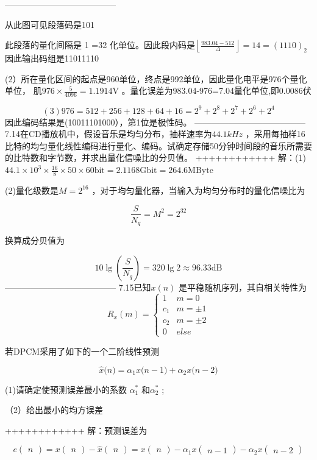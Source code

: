 \documentclass[utf8]{article}
\begin{document}
---------------------------------------

从此图可见段落码是101

此段落的量化间隔是 1 =32 化单位。因此段内码是$\left\lfloor\frac{983.04-512}{\Delta}\right\rfloor=14=\left(1110\right)_{2}$ 因此输出码组是11011110

(2）所在量化区间的起点是960单位，终点是992单位，因此量化电平是976个量化单位， 肌$976\times\frac{5}{4096}=1.1914$V 。量化误差为983.04-976=7.04量化单位,即0.0086伏

$$(3)976=512+256+128+64+16=2^9+2^8+2^7+2^6+2^4$$
因此编码结果是(10011101000），第1位是极性码。
---------------------------------------
7.14在CD播放机中，假设音乐是均匀分布，抽样速率为$44.1kHz$ ，采用每抽样16比特的均匀量化线性编码进行量化、编码。试确定存储50分钟时间段的音乐所需要的比特数和字节数，并求出量化信噪比的分贝值。
++++++++++++
解：(1)$44.1\times10^{3}\times\frac{16}{8}\times50\times60\mathrm{bit}=2.1168\mathrm{Gbit=264.6MByte}$


(2)量化级数是$M=2^{16}$ ，对于均匀量化器，当输入为均匀分布时的量化信噪比为

$$\frac{S}{N_q}=M^2=2^{32}$$

换算成分贝值为

$$10\lg\left(\frac{S}{N_q}\right)=320\lg2\approx96.33\mathrm{dB}$$
---------------------------------------
7.15已知$x(n)$ 是平稳随机序列，其自相关特性为
$$R_{x}\left(m\right)=\begin{cases}1&m=0\\c_{1}&m=\pm1\\c_{2}&m=\pm2\\0&else\end{cases}$$

若DPCM采用了如下的一个二阶线性预测

$$\hat{x}\big(n\big)=\alpha_1x\big(n-1\big)+\alpha_2x\big(n-2\big)$$

(1)请确定使预测误差最小的系数 $\alpha_{1}^{*}$ 和$\alpha_2^{*}$ ;

（2）给出最小的均方误差

++++++++++++
解：预测误差为

$$e\begin{pmatrix}n\end{pmatrix}=x\begin{pmatrix}n\end{pmatrix}-\hat{x}\begin{pmatrix}n\end{pmatrix}=x\begin{pmatrix}n\end{pmatrix}-\alpha_1x\begin{pmatrix}n-1\end{pmatrix}-\alpha_2x\begin{pmatrix}n-2\end{pmatrix}$$
\end{document}
